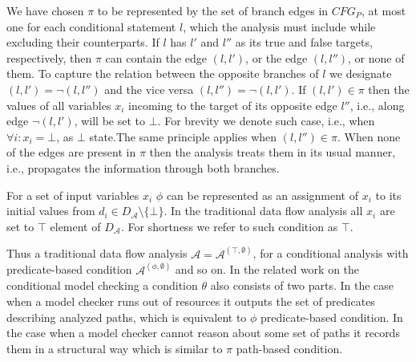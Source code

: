We have chosen $\pi$ to be represented by the set of branch edges in $CFG_P$, at most one for each conditional statement $l$,  which the analysis must include while excluding their counterparts. If $l$ has $l'$ and $l''$ as its true and false targets, respectively, then $\pi$ can contain  the edge $(l,l')$, or the edge $(l,l'')$, or none of them. To capture the relation between the opposite branches of $l$ we designate $(l,l')=\neg (l,l'')$ and the vice versa $(l,l'') = \neg (l,l')$. If $(l,l') \in \pi$ then the values of all variables $x_i$ incoming to the target  of its opposite edge $l''$, i.e., along edge $\neg (l,l')$, will be set to $\bot$. For brevity  we denote such case, i.e., when $\forall i : x_i = \bot$, as $\bot$ state.The same principle applies when $(l,l'') \in \pi$.   When none of the edges are present in $\pi$ then the analysis treats them in its usual manner, i.e., propagates the information through both branches.

For a set of input variables $x_i$ $\phi$ can be represented as an assignment of $x_i$ to its initial values from $d_i \in D_\mathcal{A}\setminus\{\bot\}$. In the traditional data flow analysis all $x_i$ are set to $\top$ element of  $D_\mathcal{A}$. For shortness we refer to such condition as $\top$.

Thus a traditional data flow analysis $\mathcal{A} = \mathcal{A}^{(\top,\emptyset)}$, for a conditional analysis with predicate-based condition $\mathcal{A}^{(\phi,\emptyset)}$ and so on. In the related work on the conditional model checking a condition $\theta$ also consists of two parts. In the case when a model checker runs out of resources it outputs the set of predicates describing analyzed paths, which is equivalent to $\phi$ predicate-based condition. In the case when a model checker cannot reason about some set of paths it records them in a structural way which is similar to $\pi$ path-based condition.


